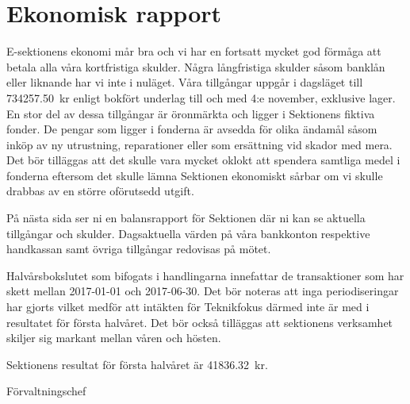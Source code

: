 \documentclass[../_main/handlingar.tex]{subfiles}
\begin{document}
\section{Ekonomisk rapport}
E-sektionens ekonomi mår bra och vi har en fortsatt mycket god förmåga att betala alla våra kortfristiga skulder. Några långfristiga skulder såsom banklån eller liknande har vi inte i nuläget. Våra tillgångar uppgår i dagsläget till \SI{734257.50}{kr} enligt bokfört underlag till och med 4:e november, exklusive lager. En stor del av dessa tillgångar är öronmärkta och ligger i Sektionens fiktiva fonder. De pengar som ligger i fonderna är avsedda för olika ändamål såsom inköp av ny utrustning, reparationer eller som ersättning vid skador med mera. Det bör tilläggas att det skulle vara mycket oklokt att spendera samtliga medel i fonderna eftersom det skulle lämna Sektionen ekonomiskt sårbar om vi skulle drabbas av en större oförutsedd utgift.

På nästa sida ser ni en balansrapport för Sektionen där ni kan se aktuella tillgångar och skulder. Dagsaktuella värden på våra bankkonton respektive handkassan samt övriga tillgångar redovisas på mötet.

Halvårsbokslutet som bifogats i handlingarna innefattar de transaktioner som har skett mellan 2017-01-01 och 2017-06-30. Det bör noteras att inga periodiseringar har gjorts vilket medför att intäkten för Teknikfokus därmed inte är med i resultatet för första halvåret. Det bör också tilläggas att sektionens verksamhet skiljer sig markant mellan våren och hösten.

Sektionens resultat för första halvåret är \SI{41836.32}{kr}.
\begin{signatures}{1}
    \mvh
    \signature{Magnus Lundh}{Förvaltningschef}
\end{signatures}
\end{document}

